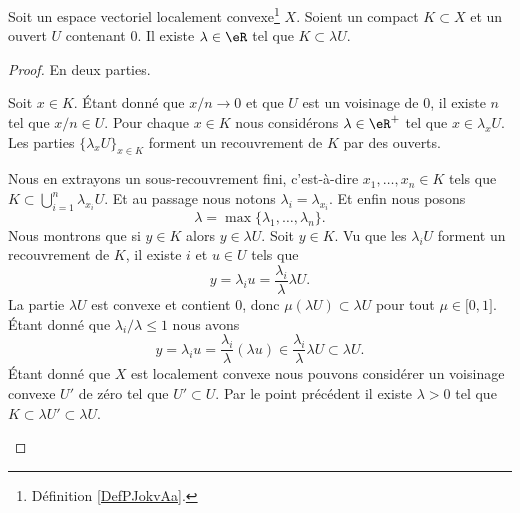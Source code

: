 \begin{lemma}        \label{LEMooDVZWooWKRQWC}
	Soit un espace vectoriel localement convexe\footnote{Définition \ref{DefPJokvAa}.} \( X\). Soient un compact \( K\subset X\) et un ouvert \( U\) contenant \( 0\). Il existe \( \lambda\in \eR\) tel que \( K\subset \lambda U\).
\end{lemma}

\begin{proof}
	En deux parties.
	\begin{subproof}
		Soit \( x\in K\). Étant donné que \( x/n\to 0\) et que \( U\) est un voisinage de \( 0\), il existe \( n\) tel que \( x/n\in U\). Pour chaque \( x\in K\) nous considérons \( \lambda\in \eR^+\) tel que \( x\in \lambda_xU\). Les parties \( \{ \lambda_x U \}_{x\in K}\) forment un recouvrement de \( K\) par des ouverts.

		Nous en extrayons un sous-recouvrement fini, c'est-à-dire \( x_1,\ldots,x_n\in K\) tels que \( K\subset\bigcup_{i=1}^n\lambda_{x_i}U\). Et au passage nous notons \( \lambda_i=\lambda_{x_i}\). Et enfin nous posons
		\begin{equation}
			\lambda=\max\{ \lambda_1,\ldots,\lambda_n \}.
		\end{equation}
		Nous montrons que si \( y\in K\) alors \( y\in \lambda U\). Soit \( y\in K\). Vu que les \( \lambda_i U\) forment un recouvrement de \( K\), il existe \( i\) et \( u\in U\) tels que
		\begin{equation}
			y=\lambda_i u=\frac{ \lambda_i }{ \lambda }\lambda U.
		\end{equation}
		La partie \( \lambda U\) est convexe et contient \( 0\), donc \( \mu (\lambda U)\subset \lambda U\) pour tout \( \mu\in\mathopen[ 0,1\mathclose]\). Étant donné que \( \lambda_i/\lambda\leq 1\) nous avons
		\begin{equation}
			y=\lambda_i u=\frac{ \lambda_i }{ \lambda }(\lambda u)\in\frac{ \lambda_i }{ \lambda }\lambda U\subset \lambda U.
		\end{equation}
		Étant donné que \( X\) est localement convexe nous pouvons considérer un voisinage convexe \( U'\) de zéro tel que \( U'\subset U\). Par le point précédent il existe \( \lambda>0\) tel que \( K\subset \lambda U'\subset \lambda U\).
	\end{subproof}
\end{proof}

